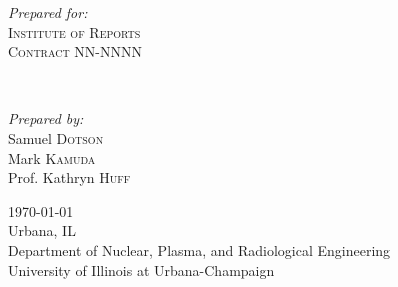 \documentclass[11pt]{article}
\begin{document}
\begin{titlepage}
	
	\begin{minipage}{0.4\textwidth}
		\begin{flushleft}
			\large
			\textit{Prepared for:}\\
			\textsc{Institute of Reports}\\ %
                        \textsc{Contract} NN-NNNN\\ %
                \end{flushleft}
	\end{minipage}
	~
	\begin{minipage}{0.4\textwidth}
		\begin{flushright}
			\large
			\textit{Prepared by:}\\
			Samuel \textsc{Dotson}\\ %
			Mark \textsc{Kamuda}\\ %
			Prof. Kathryn \textsc{Huff} %
		\end{flushright}
	\end{minipage}
	
	
	
	\vfill\vfill\vfill %
	
	{\large\today}\\ %
        \vfill
	{\large Urbana, IL}\\ %
        {\large Department of Nuclear, Plasma, and Radiological Engineering\\
        University of Illinois at Urbana-Champaign}\\ %
	
	
	
	\vfill %
	
\end{titlepage}

\end{document}
